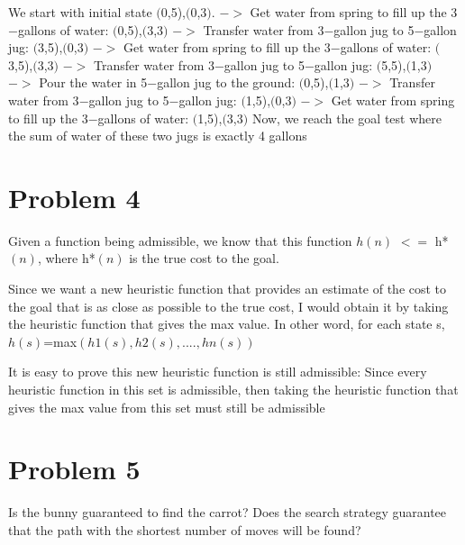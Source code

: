 \documentclass[11pt]{article}
\begin{document}
We start with initial state $($0,5),$($0,3$)$. \newline
$->$ Get water from spring to fill up the 3$-$gallons of water: $($0,5),$($3,3$)$ \newline
$->$ Transfer water from 3$-$gallon jug to 5$-$gallon jug: $($3,5),$($0,3$)$ \newline
$->$ Get water from spring to fill up the 3$-$gallons of water: $($3,5),$($3,3$)$ \newline
$->$ Transfer water from 3$-$gallon jug to 5$-$gallon jug: $($5,5),$($1,3$)$ \newline
$->$ Pour the water in 5$-$gallon jug to the ground: $($0,5),$($1,3$)$ \newline
$->$ Transfer water from 3$-$gallon jug to 5$-$gallon jug: $($1,5),$($0,3$)$ \newline
$->$ Get water from spring to fill up the 3$-$gallons of water: $($1,5),$($3,3$)$  \newline
Now, we reach the goal test where the sum of water of these two jugs is exactly 4 gallons \newline


\section*{Problem 4} 


Given a function being admissible, we know that this function $h(n)$ $<=$ h*$(n)$, where h*$(n)$ is the true cost to the goal. \newline

Since we want a new heuristic function that provides an estimate of the cost to the goal that is as close as possible to the true cost, I would obtain it by taking the heuristic function that gives the max value. In other word, for each state s, $h(s)$=max$(h1(s),h2(s),....,hn(s))$ \newline

It is easy to prove this new heuristic function is still admissible: Since every heuristic function in this set is admissible, then taking the heuristic function that gives the max value from this set must still be admissible \newline

\section*{Problem 5} 

Is the bunny guaranteed to find the carrot? Does the search strategy guarantee that the path with the shortest number of moves will be found? \newline
\end{document}
